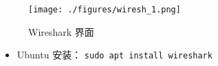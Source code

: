 
\begin{issues}
\issueDraft
\end{issues}

\begin{figure}[ht]
\centering
\texttt{[image: ./figures/wiresh\_1.png]}
\caption{Wireshark 界面} \label{wiresh_fig1}
\end{figure}

\begin{itemize}
\item Ubuntu 安装： \verb|sudo apt install wireshark|
\end{itemize}
